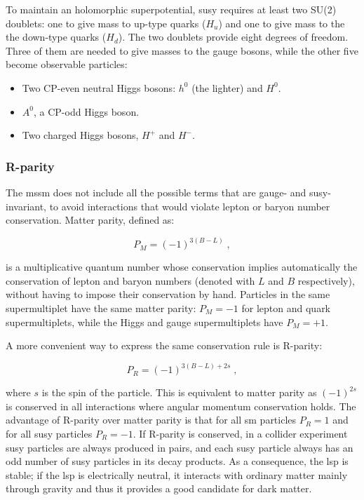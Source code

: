 To maintain an holomorphic superpotential, \gls{susy} requires at least two SU(2) doublets: one to give mass to up-type quarks ($H_u$) and one to give mass to the the down-type quarks ($H_d$). The two doublets provide eight degrees of freedom. Three of them are  needed to give masses to the gauge bosons, while the other five become observable particles:
\begin{itemize}
\item Two CP-even neutral Higgs bosons: $h^0$ (the lighter) and $H^0$.
\item $A^0$, a CP-odd Higgs boson.
\item Two charged Higgs bosons, $H^+$ and $H^-$.
\end{itemize}


\subsubsection*{R-parity}

The \gls{mssm} does not include all the possible terms that are gauge- and \gls{susy}-invariant, to avoid interactions that would violate lepton or baryon number conservation. Matter parity, defined as:

\begin{equation}
P_M = (-1)^{3 (B-L)} \; ,
\label{eq:defmatterparity}
\end{equation}

\noindent is a multiplicative quantum number whose conservation implies automatically the conservation of lepton and baryon numbers (denoted with $L$ and $B$ respectively), without having to impose their conservation by hand. Particles in the same supermultiplet have the same matter parity: $P_M =-1$ for lepton and quark supermultiplets, while the Higgs and gauge supermultiplets have $P_M =+1$.

A more convenient way to express the same conservation rule is R-parity:

\begin{equation}
P_R = (-1)^{3(B-L) + 2 s} \; ,
\label{eq:defRparity}
\end{equation}

\noindent where $s$ is the spin of the particle. This is equivalent to matter parity as $(-1)^{2s}$ is conserved in all interactions where angular momentum conservation holds. The advantage of R-parity over matter parity is that for all \gls{sm} particles $P_R = 1$ and for all \gls{susy} particles $P_R=-1$. If  R-parity is conserved, in a collider experiment \gls{susy} particles are always produced in pairs, and each \gls{susy} particle always has an odd number of \gls{susy} particles in its decay products. As a consequence, the \gls{lsp} is stable; if the \gls{lsp} is electrically neutral, it interacts with ordinary matter mainly through gravity and thus it provides a good candidate for dark matter.

